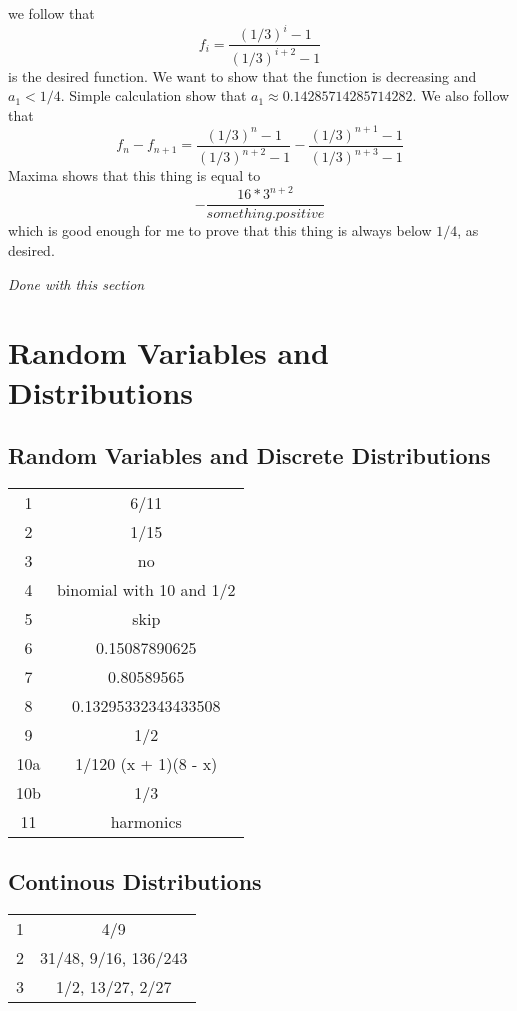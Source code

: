 \documentclass[11pt,oneside,titlepage]{book}
\begin{document}
we follow that
$$f_i = \frac{(1/3)^i - 1}{(1/3)^{i + 2} - 1}$$
is the desired function. We want to show that the function is decreasing and $a_1 < 1/4$.
Simple calculation show that $a_1 \approx 0.14285714285714282$. We also follow that
$$f_n - f_{n + 1} = \frac{(1/3)^n - 1}{(1/3)^{n + 2} - 1} -
\frac{(1/3)^{n + 1} - 1}{(1/3)^{n + 3} - 1}$$
Maxima shows that this thing is equal to
$$- \frac{16 * 3^{n + 2}}{something . positive}$$
which is good enough for me to prove that this thing is always below $1/4$, as desired.

\textit{Done with this section}

\chapter{Random Variables and Distributions}

\section{Random Variables and Discrete Distributions}

\begin{tabular}[center]{||c | c|| }
  \hline
  1 & 6/11 \\
  2 & 1/15 \\
  3 & no \\
  4 & binomial with 10 and 1/2 \\
  5 & skip \\
  6 & 0.15087890625\\
  7 & 0.80589565 \\
  8 & 0.13295332343433508 \\
  9 & 1/2 \\
  10a & 1/120 (x + 1)(8 - x) \\
  10b & 1/3 \\
  11 & harmonics\\
  \hline 
\end{tabular}

\section{Continous Distributions}

\begin{tabular}[center]{||c | c|| }
  \hline
  1 & 4/9 \\
  2 & 31/48, 9/16, 136/243 \\
  3 & 1/2, 13/27, 2/27 \\  
  \hline 
\end{tabular}
\end{document}

